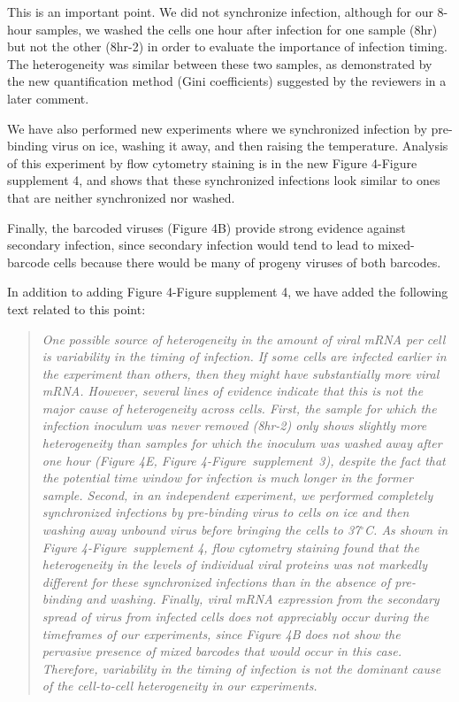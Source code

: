 \documentclass[11pt, oneside]{article}   	%
\begin{document}
{\color{black}
This is an important point.
We did not synchronize infection, although for our 8-hour samples, we washed the cells one hour after infection for one sample (8hr) but not the other (8hr-2) in order to evaluate the importance of infection timing.
The heterogeneity was similar between these two samples, as demonstrated by the new quantification method (Gini coefficients) suggested by the reviewers in a later comment.

We have also performed new experiments where we synchronized infection by pre-binding virus on ice, washing it away, and then raising the temperature.
Analysis of this experiment by flow cytometry staining is in the new Figure 4-Figure supplement 4, and shows that these synchronized infections look similar to ones that are neither synchronized nor washed.

Finally, the barcoded viruses (Figure 4B) provide strong evidence against secondary infection, since secondary infection would tend to lead to mixed-barcode cells because there would be many of progeny viruses of both barcodes.

In addition to adding Figure 4-Figure supplement 4, we have added the following text related to this point:

\begin{quote}
\textsl{
One possible source of heterogeneity in the amount of viral mRNA per cell is variability in the timing of infection.
If some cells are infected earlier in the experiment than others, then they might have substantially more viral mRNA.
However, several lines of evidence indicate that this is not the major cause of heterogeneity across cells.
First, the sample for which the infection inoculum was never removed (8hr-2) only shows slightly more heterogeneity than samples for which the inoculum was washed away after one hour (Figure 4E, Figure 4-Figure~supplement~3), despite the fact that the potential time window for infection is much longer in the former sample.
Second, in an independent experiment, we performed completely synchronized infections by pre-binding virus to cells on ice and then washing away unbound virus before bringing the cells to 37$^{\circ}$C.
As shown in Figure 4-Figure~supplement 4, flow cytometry staining found that the heterogeneity in the levels of individual viral proteins was not markedly different for these synchronized infections than in the absence of pre-binding and washing.
Finally, viral mRNA expression from the secondary spread of virus from infected cells does not appreciably occur during the timeframes of our experiments, since Figure 4B does not show the pervasive presence of mixed barcodes that would occur in this case.
Therefore, variability in the timing of infection is not the dominant cause of the cell-to-cell heterogeneity in our experiments.
}
\end{quote}
}
\end{document}

